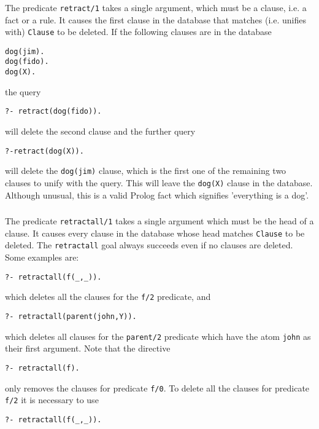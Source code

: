 

\begin{frame}[shrink=7]
	\frametitle{\insertsection}
	
	The predicate \texttt{retract/1} takes a single argument, which must be a clause, i.e. a fact or a rule. It causes the first clause in the database that matches (i.e. unifies with) \texttt{Clause} to be deleted. If the following clauses are in the database
	
	\texttt{dog(jim).\\dog(fido).\\dog(X).}
	
	the query
	
	\texttt{?- retract(dog(fido)).}
	
	will delete the second clause and the further query
	
	\texttt{?-retract(dog(X)).}
	
	will delete the \texttt{dog(jim)} clause, which is the first one of the remaining two clauses to unify with the query. This will leave the \texttt{dog(X)} clause in the database. Although unusual, this is a valid Prolog fact which signifies 'everything is a dog'.
	
\end{frame}


\begin{frame}[shrink=7]
	\frametitle{\insertsection}
	
	The predicate \texttt{retractall/1} takes a single argument which must be the head of a clause. It causes every clause in the database whose head matches \texttt{Clause} to be
	deleted. The \texttt{retractall} goal always succeeds even if no clauses are deleted. Some examples are:
	
	\texttt{?- retractall(f(\_,\_)).}
	
	which deletes all the clauses for the \texttt{f/2} predicate, and
	
	\texttt{?- retractall(parent(john,Y)).}
	
	which deletes all clauses for the \texttt{parent/2} predicate which have the atom \texttt{john} as their first argument. Note that the directive
	
	\texttt{?- retractall(f).}
	
	only removes the clauses for predicate \texttt{f/0}. To delete all the clauses for predicate \texttt{f/2} it is necessary to use
	
	\texttt{?- retractall(f(\_,\_)).}
\end{frame}



